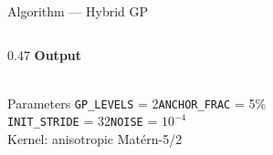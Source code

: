 \documentclass[aspectratio=169, 10pt]{beamer}
\begin{document}
\begin{frame}[shrink=8]{Algorithm — Hybrid GP}
\begin{columns}[T, totalwidth=\textwidth]
\begin{column}{0.47\textwidth}
    \smallskip
    {\footnotesize\bfseries\color{cteal} Output}\\[1pt]
    \\[1pt]

    \medskip
    \begin{block}{Parameters}
      \footnotesize
      \texttt{GP\_LEVELS} = 2\quad\texttt{ANCHOR\_FRAC} = 5\%\\
      \texttt{INIT\_STRIDE} = 32\quad\texttt{NOISE} = $10^{-4}$\\
      Kernel: anisotropic Matérn-5/2
    \end{block}
  \end{column}

\end{columns}
\end{frame}
\end{document}
